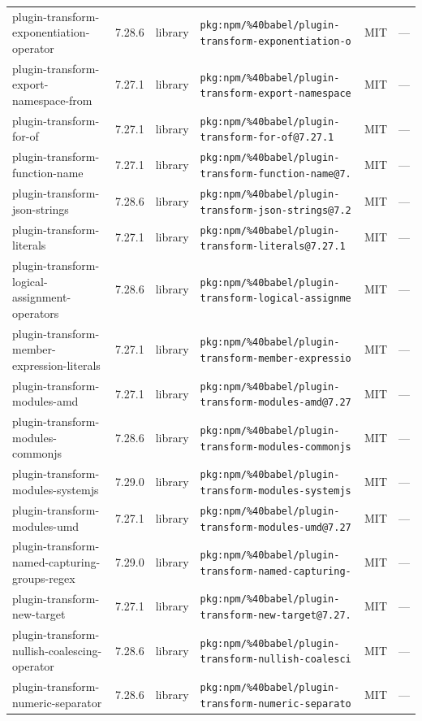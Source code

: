 \documentclass[11pt]{article}
\begin{document}
\begin{longtable}{|l|l|l|p{2.2cm}|l|p{4cm}|}
plugin-transform-exponentiation-operator & 7.28.6 & library & \texttt{pkg:npm/\%40babel/plugin-transform-exponentiation-o} & MIT & — \\
plugin-transform-export-namespace-from & 7.27.1 & library & \texttt{pkg:npm/\%40babel/plugin-transform-export-namespace} & MIT & — \\
plugin-transform-for-of & 7.27.1 & library & \texttt{pkg:npm/\%40babel/plugin-transform-for-of@7.27.1} & MIT & — \\
plugin-transform-function-name & 7.27.1 & library & \texttt{pkg:npm/\%40babel/plugin-transform-function-name@7.} & MIT & — \\
plugin-transform-json-strings & 7.28.6 & library & \texttt{pkg:npm/\%40babel/plugin-transform-json-strings@7.2} & MIT & — \\
plugin-transform-literals & 7.27.1 & library & \texttt{pkg:npm/\%40babel/plugin-transform-literals@7.27.1} & MIT & — \\
plugin-transform-logical-assignment-operators & 7.28.6 & library & \texttt{pkg:npm/\%40babel/plugin-transform-logical-assignme} & MIT & — \\
plugin-transform-member-expression-literals & 7.27.1 & library & \texttt{pkg:npm/\%40babel/plugin-transform-member-expressio} & MIT & — \\
plugin-transform-modules-amd & 7.27.1 & library & \texttt{pkg:npm/\%40babel/plugin-transform-modules-amd@7.27} & MIT & — \\
plugin-transform-modules-commonjs & 7.28.6 & library & \texttt{pkg:npm/\%40babel/plugin-transform-modules-commonjs} & MIT & — \\
plugin-transform-modules-systemjs & 7.29.0 & library & \texttt{pkg:npm/\%40babel/plugin-transform-modules-systemjs} & MIT & — \\
plugin-transform-modules-umd & 7.27.1 & library & \texttt{pkg:npm/\%40babel/plugin-transform-modules-umd@7.27} & MIT & — \\
plugin-transform-named-capturing-groups-regex & 7.29.0 & library & \texttt{pkg:npm/\%40babel/plugin-transform-named-capturing-} & MIT & — \\
plugin-transform-new-target & 7.27.1 & library & \texttt{pkg:npm/\%40babel/plugin-transform-new-target@7.27.} & MIT & — \\
plugin-transform-nullish-coalescing-operator & 7.28.6 & library & \texttt{pkg:npm/\%40babel/plugin-transform-nullish-coalesci} & MIT & — \\
plugin-transform-numeric-separator & 7.28.6 & library & \texttt{pkg:npm/\%40babel/plugin-transform-numeric-separato} & MIT & — \\

\end{longtable}
\end{document}
